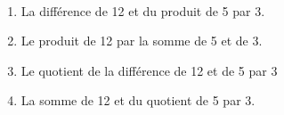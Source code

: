    \ \\ [-5mm]
   \begin{enumerate}
      \item \blue La différence de 12 et du produit de 5 par 3.
      \item \blue Le produit de 12 par la somme de 5 et de 3.
      \item \blue Le quotient de la différence de 12 et de 5 par 3
      \item \blue La somme de 12 et du quotient de 5 par 3.
   \end{enumerate}
